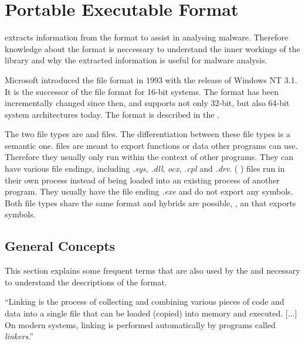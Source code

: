\chapter{Portable Executable Format} \label{chap:peformat}

\portex{} extracts information from the \PE{} format to assist in analysing malware. Therefore knowledge about the \PE{} format is neccessary to understand the inner workings of the library \portex{} and why the extracted information is useful for malware analysis. 

Microsoft introduced the \PE{} file format in 1993 with the release of Windows NT 3.1. It is the successor of the \NZ{} file format for 16-bit systems. The \PE{} format has been incrementally changed since then, and supports not only 32-bit, but also 64-bit system architectures today. The \PE{} format is described in the \PECOFF{} \cite{pespec}.

The two \PE{} file types are \DLL{} and \EXE{} files. The differentiation between these file types is a semantic one. \DLL{} files are meant to export functions or data other programs can use. Therefore they usually only run within the context of other programs. They can have various file endings, including \emph{.sys}, \emph{.dll}, \emph{ocx}, \emph{.cpl} and \emph{.drv}. (\cf{} \cite{micrdll}) 
\EXE{} files run in their own process instead of being loaded into an existing process of another program. They usually have the file ending \emph{.exe} and do not export any symbols. Both file types share the same format and hybrids are possible, \eg{}, an \EXE{} that exports symbols.

\section{General Concepts}

This section explains some frequent terms that are also used by the \PECOFF{} and necessary to understand the descriptions of the \PE{} format.

\begin{definition}[linker]
\enquote{Linking is the process of collecting and combining various pieces of code and data into a single file that can be loaded (copied) into memory and executed. [...] On modern systems, linking is performed automatically by programs called \emph{linkers}.} \cite[]{bryant11}
\end{definition} 

